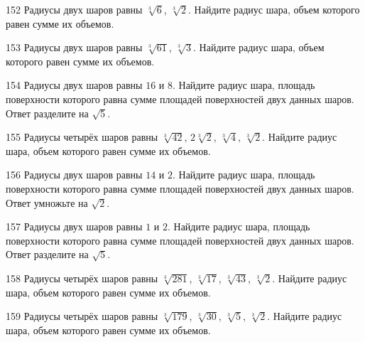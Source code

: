 \documentclass[a4paper]{article}
\begin{document}
\begin{taskBN}{152}
Радиусы двух шаров равны $\sqrt[3]{6}$, $\sqrt[3]{2}$. Найдите радиус шара, объем которого равен сумме их объемов.
\end{taskBN}

\begin{taskBN}{153}
Радиусы двух шаров равны $\sqrt[3]{61}$, $\sqrt[3]{3}$. Найдите радиус шара, объем которого равен сумме их объемов.
\end{taskBN}

\begin{taskBN}{154}
Радиусы двух шаров равны $16$ и $8$. Найдите радиус шара, площадь поверхности которого равна сумме площадей поверхностей двух данных шаров. Ответ разделите на $\sqrt{5}$.
\end{taskBN}

\begin{taskBN}{155}
Радиусы четырёх шаров равны $\sqrt[3]{42}$, $2\sqrt[3]{2}$, $\sqrt[3]{4}$, $\sqrt[3]{2}$. Найдите радиус шара, объем которого равен сумме их объемов.
\end{taskBN}

\begin{taskBN}{156}
Радиусы двух шаров равны $14$ и $2$. Найдите радиус шара, площадь поверхности которого равна сумме площадей поверхностей двух данных шаров. Ответ умножьте на $\sqrt{2}$.
\end{taskBN}

\begin{taskBN}{157}
Радиусы двух шаров равны $1$ и $2$. Найдите радиус шара, площадь поверхности которого равна сумме площадей поверхностей двух данных шаров. Ответ разделите на $\sqrt{5}$.
\end{taskBN}

\begin{taskBN}{158}
Радиусы четырёх шаров равны $\sqrt[3]{281}$, $\sqrt[3]{17}$, $\sqrt[3]{43}$, $\sqrt[3]{2}$. Найдите радиус шара, объем которого равен сумме их объемов.
\end{taskBN}

\begin{taskBN}{159}
Радиусы четырёх шаров равны $\sqrt[3]{179}$, $\sqrt[3]{30}$, $\sqrt[3]{5}$, $\sqrt[3]{2}$. Найдите радиус шара, объем которого равен сумме их объемов.
\end{taskBN}
\end{document}
